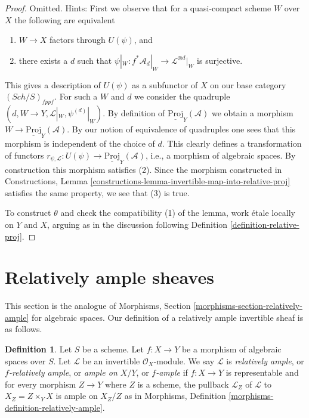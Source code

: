 \documentclass{stacks-project}
\theoremstyle{plain}
\theoremstyle{definition}
\newtheorem{definition}[subsection]{Definition}
\theoremstyle{remark}
\numberwithin{equation}{subsection}
\def\Sch{\mathit{Sch}}
\begin{document}
\begin{proof}
Omitted. Hints:
First we observe that for a quasi-compact scheme
$W$ over $X$ the following are equivalent
\begin{enumerate}
\item $W \to X$ factors through $U(\psi)$, and
\item there exists a $d$ such that
$\psi|_W : f^*\mathcal{A}_d|_W \to \mathcal{L}^{\otimes d}|_W$
is surjective.
\end{enumerate}
This gives a description of $U(\psi)$ as a subfunctor of $X$
on our base category $(\Sch/S)_{fppf}$. For such a $W$ and $d$
we consider the quadruple
$(d, W \to Y, \mathcal{L}|_W, \psi^{(d)}|_W)$.
By definition of $\underline{\text{Proj}}_Y(\mathcal{A})$
we obtain a morphism $W \to \underline{\text{Proj}}_Y(\mathcal{A})$.
By our notion of equivalence of quadruples one sees that
this morphism is independent of the choice of $d$.
This clearly defines a transformation of functors
$r_{\psi, \mathcal{L}} : U(\psi) \to \underline{\text{Proj}}_Y(\mathcal{A})$,
i.e., a morphism of algebraic spaces.
By construction this morphism satisfies (2).
Since the morphism constructed in
Constructions, Lemma \ref{constructions-lemma-invertible-map-into-relative-proj}
satisfies the same property, we see that (3) is true.

\medskip\noindent
To construct $\theta$ and check the compatibility (1) of the
lemma, work \'etale locally on $Y$ and $X$, arguing as
in the discussion following
Definition \ref{definition-relative-proj}.
\end{proof}








\section{Relatively ample sheaves}
\label{section-relatively-ample}

\noindent
This section is the analogue of
Morphisms, Section \ref{morphisms-section-relatively-ample}
for algebraic spaces.
Our definition of a relatively ample invertible sheaf is as
follows.

\begin{definition}
\label{definition-relatively-ample}
Let $S$ be a scheme.
Let $f : X \to Y$ be a morphism of algebraic spaces over $S$.
Let $\mathcal{L}$ be an invertible $\mathcal{O}_X$-module.
We say $\mathcal{L}$ is {\it relatively ample}, or {\it $f$-relatively ample},
or {\it ample on $X/Y$}, or {\it $f$-ample} if $f : X \to Y$
is representable and for every morphism $Z \to Y$
where $Z$ is a scheme, the pullback $\mathcal{L}_Z$ of $\mathcal{L}$
to $X_Z = Z \times_Y X$ is ample on $X_Z/Z$ as in
Morphisms, Definition \ref{morphisms-definition-relatively-ample}.
\end{definition}
\end{document}
